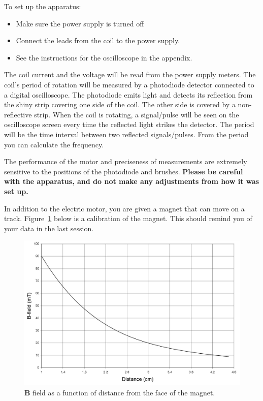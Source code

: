 \documentclass[12pt]{report}
\begin{document}
To set up the apparatus:
\begin{itemize}
\item Make sure the power supply is turned off
\item Connect the leads from the coil to the power supply.
\item See the instructions for the oscilloscope in the appendix.
\end{itemize}

The coil current and the voltage will be read from the power supply meters. The coil's period of rotation will be measured by a photodiode detector connected to a digital oscilloscope. The photodiode emits light and detects its reflection from the shiny strip covering one side of the coil. The other side is covered by a non-reflective strip. When the coil is rotating, a signal/pulse will be seen on the oscilloscope screen every time the reflected light strikes the detector. The period will be the time interval between two reflected signals/pulses. From the period you can calculate the frequency. 

The performance of the motor and preciseness of measurements are extremely sensitive to the positions of the photodiode and brushes. \textbf{Please be careful with the apparatus, and do not make any adjustments from how it was set up.}

In addition to the electric motor, you are given a magnet that can move on a track. 
Figure~\ref{Fig:lab3-sessionb-calibration-bfield} below is a calibration of the magnet. This should remind you of your data in the last session. \\

\begin{figure}[h]
\centering
\includegraphics[scale=0.8]{lab3-sessionb-calibration-bfield}
\caption{$\mathbf{B}$ field as a function of distance from the face of the magnet.}
\label{Fig:lab3-sessionb-calibration-bfield}
\end{figure}
\end{document}
